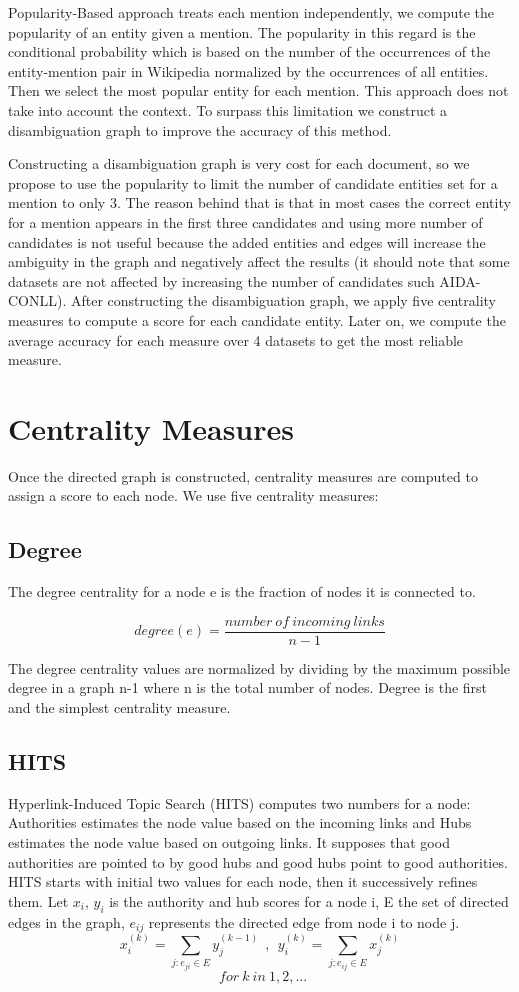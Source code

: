 \documentclass{llncs}
\begin{document}
Popularity-Based  approach treats each mention independently, we compute the popularity of an entity given a mention. The popularity in this regard is the conditional probability which is based on the number of the occurrences of the entity-mention pair in Wikipedia normalized by the occurrences of all entities. Then we select the most popular entity for each mention. This approach does not take into account the context. To surpass this limitation we construct a disambiguation graph to improve the accuracy of this method. 

Constructing a disambiguation graph is very cost for each  document, so we propose to use the popularity to limit the number of  candidate entities set for a mention to only 3. The reason behind that is that in most cases the correct entity for a mention appears in the first three candidates and  using more number of candidates is not useful because the added entities and edges will increase the ambiguity in the graph and negatively affect the results (it should note that some datasets are not affected by increasing the number of candidates such AIDA-CONLL).
After constructing the disambiguation graph, we apply five centrality measures to compute a score for each candidate entity. Later on, we compute the average accuracy for each measure over 4 datasets to get the most reliable measure.

\section{Centrality Measures}
  Once the directed graph is constructed, centrality measures are computed to assign a score to each node. We  use five centrality measures:
  \subsection{Degree}
	  The degree centrality for a node e is the fraction of nodes it is connected to. 
  
	  $$degree(e)=\frac{number\ of\ incoming\ links}{n-1}$$
  
 	The degree centrality values are normalized by dividing by the maximum possible degree in a  graph n-1 where n is the total number of nodes. Degree is the first and  the simplest  centrality measure.
  \subsection{HITS}
  Hyperlink-Induced Topic Search (HITS)  \cite{kleinberg_authoritative_1999} computes two numbers for a node: Authorities estimates the node value based on the incoming links and  Hubs estimates the node value based on outgoing links. It supposes that good authorities are pointed to by good hubs and good hubs point to good authorities. HITS starts with initial two values for each node, then it  successively refines them. Let $x_{i}$, $y_{i}$ is the authority and hub scores for a node i, E the set of directed edges in the graph, $e_{ij}$ represents the directed edge from node i to node j.
  $$x_{i}^{(k)}=\sum_{j:e_{ji}\in E} {y_{j}^{(k-1)}} \  \ , \ \  y_{i}^{(k)}=\sum_{j:e_{ij}\in E} {x_{j}^{(k)}} $$
  $$ \  \  for \ k \ in \ 1,2,...
  $$
\end{document}
